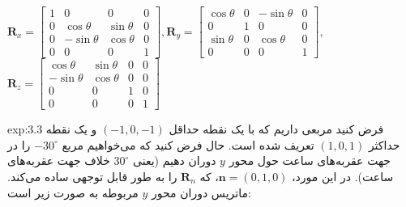 {\begin{spacing}{1.5}
        \begin{center}
            $\textbf{R}_{x}=\begin{bmatrix}
                                1 & 0           & 0          & 0 \\
                                0 & \cos\theta  & \sin\theta & 0 \\
                                0 & -\sin\theta & \cos\theta & 0 \\
                                0 & 0           & 0          & 1
            \end{bmatrix}, \textbf{R}_{y}=\begin{bmatrix}
                                              \cos\theta & 0 & -\sin\theta & 0 \\
                                              0          & 1 & 0           & 0 \\
                                              \sin\theta & 0 & \cos\theta  & 0 \\
                                              0          & 0 & 0           & 1
            \end{bmatrix},$\\$\textbf{R}_{z}=\begin{bmatrix}
                                                 \cos\theta  & \sin\theta & 0 & 0 \\
                                                 -\sin\theta & \cos\theta & 0 & 0 \\
                                                 0           & 0          & 1 & 0 \\
                                                 0           & 0          & 0 & 1
            \end{bmatrix}$
        \end{center}

        \begin{example}{exp:3.3}
            \Large
            فرض کنید مربعی داریم که با یک نقطه حداقل $(-1, 0, -1)$ و یک نقطه حداکثر $(1, 0, 1)$ تعریف شده است.
            حال فرض کنید که می‌خواهیم مربع $-30^\circ$ را در جهت عقربه‌های ساعت حول محور $y$ دوران دهیم (یعنی $30^\circ$ خلاف جهت عقربه‌های ساعت).
            در این مورد، $\textbf{n}=(0,1,0)$، که $\textbf{R}_{n}$ را به طور قابل توجهی ساده می‌کند.
            ماتریس دوران محور $y$  مربوطه به صورت زیر است:


\end{example}
\end{spacing}}

